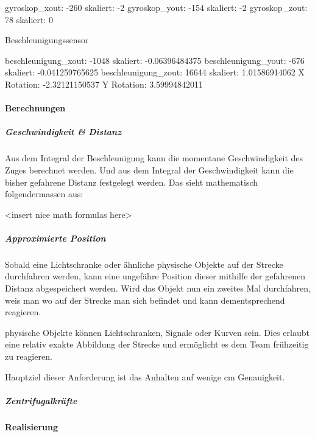 \documentclass[../..main.tex]{subfiles}
\begin{document}
gyroskop\_xout:   -260  skaliert:  -2
gyroskop\_yout:   -154  skaliert:  -2
gyroskop\_zout:     78  skaliert:  0

Beschleunigungssensor

beschleunigung\_xout:   -1048  skaliert:  -0.06396484375
beschleunigung\_yout:    -676  skaliert:  -0.041259765625
beschleunigung\_zout:   16644  skaliert:  1.01586914062
X Rotation:  -2.32121150537
Y Rotation:  3.59994842011

\paragraph{Berechnungen}

\subparagraph{Geschwindigkeit & Distanz}
Aus dem Integral der Beschleunigung kann die momentane Geschwindigkeit des Zuges berechnet werden. Und aus dem Integral der Geschwindigkeit kann die bisher gefahrene Distanz festgelegt werden. Das sieht mathematisch folgendermassen aus:

<insert nice math formulas here>

\subparagraph{Approximierte Position}
Sobald eine Lichtschranke oder ähnliche physische Objekte auf der Strecke durchfahren werden, kann eine ungefähre Position dieser mithilfe der gefahrenen Distanz abgespeichert werden. Wird das Objekt nun ein zweites Mal durchfahren, weis man wo auf der Strecke man sich befindet und kann dementsprechend reagieren.

physische Objekte können Lichtschranken, Signale oder Kurven sein. Dies erlaubt eine relativ exakte Abbildung der Strecke und ermöglicht es dem Team frühzeitig zu reagieren.

Hauptziel dieser Anforderung ist das Anhalten auf wenige cm Genauigkeit.

\subparagraph{Zentrifugalkräfte}


\paragraph{Realisierung}
\end{document}
